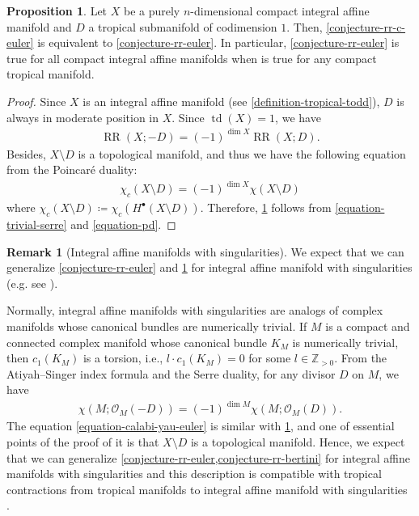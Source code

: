 \documentclass[a4paper,dvipdfmx,reqno,12pt]{amsart}
\theoremstyle{definition}
\newtheorem{proposition}[theorem]{Proposition}
\newtheorem{remark}[theorem]{Remark}
\newcommand{\deq}{\coloneqq}
\newcommand{\opn}[1]{\operatorname{#1}}
\numberwithin{equation}{section}
\begin{document}
\begin{proposition}
\label{proposition-divisor-poincare}
Let $X$ be a purely 
$n$-dimensional compact integral
affine manifold and $D$ a tropical submanifold 
of codimension $1$.
Then, \cref{conjecture-rr-c-euler} is 
equivalent to
\cref{conjecture-rr-euler}. In particular,
\cref{conjecture-rr-euler} is true for
all compact integral affine manifolds when
\cite[Conjecture 6.13]{demedrano2023chern} is
true for any compact tropical manifold.
\end{proposition}
\begin{proof}
Since $X$ is an integral affine manifold
(see \cref{definition-tropical-todd}),
$D$ is always in moderate position in $X$.
Since $\opn{td}(X)=1$, we have
\begin{align}
\label{equation-trivial-serre}
\opn{RR}(X;-D)=(-1)^{\dim X}\opn{RR}(X;D).
\end{align}
Besides, $X\setminus D$ is a topological manifold, 
and thus we have the following equation from 
the Poincar\'e duality:
\begin{align}
\label{equation-pd}
\chi_c(X\setminus D)=(-1)^{\dim X}\chi(X\setminus D)
\end{align}
where $\chi_c(X\setminus D)\deq 
\chi_c(H^{\bullet}(X\setminus D))$.
Therefore, \cref{proposition-divisor-poincare} follows from
\cref{equation-trivial-serre} and
\cref{equation-pd}.
\end{proof}

\begin{remark}[{Integral affine manifolds with singularities}]
\label{remark-iass}
We expect that we can generalize
\cref{conjecture-rr-euler} and 
\cref{proposition-divisor-poincare}
for integral affine manifold with singularities
(e.g. see \cite{MR2213573,MR2181810,MR4347312}).

Normally, integral affine manifolds with singularities
are analogs of complex manifolds whose canonical bundles
are numerically trivial. If $M$ is a compact and
connected complex manifold whose canonical bundle $K_M$ is
numerically trivial, then $c_1(K_M)$ is a torsion,
i.e., $l\cdot c_1(K_M)=0$ for 
some $l\in \mathbb{Z}_{>0}$.
From the Atiyah--Singer index formula and the Serre duality, 
for any divisor $D$ on $M$, we have
\begin{align}
\label{equation-calabi-yau-euler}
\chi(M;\mathcal{O}_M(-D))=(-1)^{\dim M}
\chi(M;\mathcal{O}_{M}(D)).
\end{align}
The equation \cref{equation-calabi-yau-euler} is
similar with
\cref{proposition-divisor-poincare}, and 
one of essential points of the proof of it
is that $X\setminus D$ is a topological manifold.
Hence, we expect that we can generalize
\cref{conjecture-rr-euler,conjecture-rr-bertini} for 
integral affine manifolds with singularities
and this description is compatible with
tropical contractions from tropical manifolds
to integral affine manifold with singularities
\cite{yamamoto2021tropical}.
\end{remark}
\end{document}
